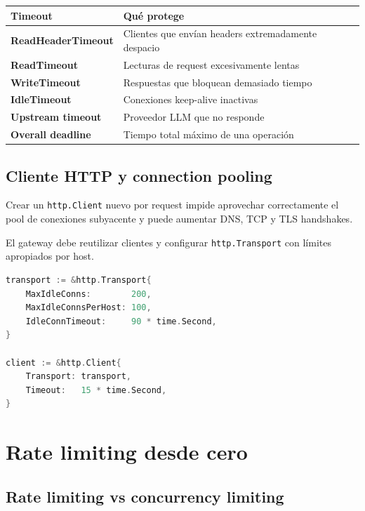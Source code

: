 \documentclass[11pt,a4paper]{article}
\newcommand{\code}[1]{\texttt{#1}}
\begin{document}
\begin{table}[h]
\centering
\small
\begin{tabularx}{\textwidth}{>{\bfseries}p{3.4cm} X}
\toprule
Timeout & Qué protege \\
\midrule
ReadHeaderTimeout & Clientes que envían headers extremadamente despacio \\
ReadTimeout & Lecturas de request excesivamente lentas \\
WriteTimeout & Respuestas que bloquean demasiado tiempo \\
IdleTimeout & Conexiones keep-alive inactivas \\
Upstream timeout & Proveedor LLM que no responde \\
Overall deadline & Tiempo total máximo de una operación \\
\bottomrule
\end{tabularx}
\end{table}

\subsection{Cliente HTTP y connection pooling}

Crear un \code{http.Client} nuevo por request impide aprovechar correctamente el pool de conexiones subyacente y puede aumentar DNS, TCP y TLS handshakes.

El gateway debe reutilizar clientes y configurar \code{http.Transport} con límites apropiados por host.

\begin{lstlisting}[language=Go,caption={Cliente HTTP reutilizable}]
transport := &http.Transport{
    MaxIdleConns:        200,
    MaxIdleConnsPerHost: 100,
    IdleConnTimeout:     90 * time.Second,
}

client := &http.Client{
    Transport: transport,
    Timeout:   15 * time.Second,
}
\end{lstlisting}

\section{Rate limiting desde cero}

\subsection{Rate limiting vs concurrency limiting}
\end{document}
